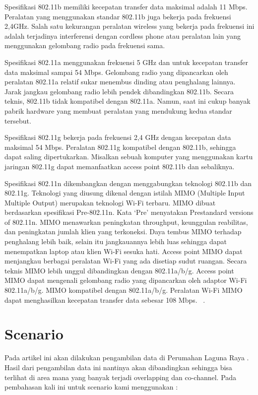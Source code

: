 \documentclass[conference]{IEEEtran}
\begin{document}
    Spesifikasi 802.11b memiliki kecepatan transfer data maksimal adalah 11 Mbps. Peralatan yang menggunakan standar 802.11b juga bekerja pada frekuensi 2,4GHz. Salah satu kekurangan peralatan wireless yang bekerja pada frekuensi ini adalah terjadinya interferensi dengan cordless phone atau peralatan lain yang menggunakan gelombang radio pada frekuensi sama.
    
    Spesifikasi 802.11a menggunakan frekuensi 5 GHz dan untuk kecepatan transfer data maksimal sampai 54 Mbps. Gelombang radio yang dipancarkan oleh peralatan 802.11a relatif sukar menembus dinding atau penghalang lainnya. Jarak jangkau gelombang radio lebih pendek dibandingkan 802.11b. Secara teknis, 802.11b tidak kompatibel dengan 802.11a. Namun, saat ini cukup banyak pabrik hardware yang membuat peralatan yang mendukung kedua standar tersebut.
    
    Spesifikasi 802.11g bekerja pada frekuensi 2,4 GHz dengan kecepatan data maksimal 54 Mbps. Peralatan 802.11g kompatibel dengan 802.11b, sehingga dapat saling dipertukarkan. Misalkan sebuah komputer yang menggunakan kartu jaringan 802.11g dapat memanfaatkan access point 802.11b dan sebaliknya.

    Spesifikasi 802.11n dikembangkan dengan menggabungkan teknologi 802.11b dan 802.11g. Teknologi yang diusung dikenal dengan istilah MIMO (Multiple Input
    Multiple Output) merupakan teknologi Wi-Fi terbaru. MIMO dibuat berdasarkan spesifikasi Pre-802.11n. Kata ‘Pre’ menyatakan Prestandard versions of 802.11n. MIMO menawarkan peningkatan throughput, keunggulan reabilitas, dan peningkatan jumlah klien yang terkoneksi. Daya tembus MIMO terhadap penghalang lebih baik, selain itu jangkauannya lebih luas sehingga dapat menempatkan laptop atau klien Wi-Fi sesuka hati. Access point MIMO dapat menjangkau berbagai peralatan Wi-Fi yang ada disetiap sudut ruangan. Secara teknis MIMO lebih unggul dibandingkan dengan 802.11a/b/g. Access point MIMO dapat mengenali gelombang radio yang dipancarkan oleh adaptor Wi-Fi 802.11a/b/g. MIMO kompatibel dengan 802.11a/b/g. Peralatan Wi-Fi MIMO dapat menghasilkan kecepatan transfer data sebesar 108 Mbps.
    ~\cite{b7}.

    \section{Scenario}
    Pada artikel ini akan dilakukan pengambilan data di Perumahan Laguna Raya . Hasil dari pengambilan data ini nantinya akan dibandingkan sehingga bisa terlihat di area mana yang banyak terjadi overlapping dan co-channel.
    Pada pembahasan kali ini untuk scenario kami menggunakan :
\end{document}
